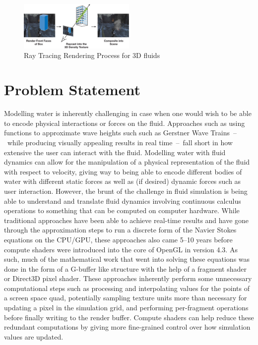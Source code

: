 \documentclass[conference]{IEEEtran}
\begin{document}
\begin{figure}[htbp]
\centerline{\includegraphics[width=0.5\textwidth]{volumerender.jpg}}
\caption{Ray Tracing Rendering Process for 3D fluids \cite{fluidrender}}
\label{volumerender}
\end{figure}

\section{Problem Statement}
Modelling water is inherently challenging in case when one would wish to be able to encode physical interactions or forces on the fluid. Approaches such as using functions to approximate wave heights such such as Gerstner Wave \mbox{Trains -- while} producing visually appealing results in real \mbox{time -- fall} short in how extensive the user can interact with the fluid. Modelling water with fluid dynamics can allow for the manipulation of a physical representation of the fluid with respect to velocity, giving way to being able to encode different bodies of water with different static forces as well as (if desired) dynamic forces such as user interaction. However, the brunt of the challenge in fluid simulation is being able to understand and translate fluid dynamics involving continuous calculus operations to something that can be computed on computer hardware.
While traditional approaches have been able to achieve real-time results and have gone through the approximation steps to run a discrete form of the Navier Stokes equations on the CPU/GPU, these approaches also came 5--10 years before compute shaders were introduced into the core of OpenGL in version 4.3. As such, much of the mathematical work that went into solving these equations was done in the form of a G-buffer like structure with the help of a fragment shader or Direct3D pixel shader. These approaches inherently perform some unnecessary computational steps such as processing and interpolating values for the points of a screen space quad, potentially sampling texture units more than necessary for updating a pixel in the simulation grid, and performing per-fragment operations before finally writing to the render buffer. Compute shaders can help reduce these redundant computations by giving more fine-grained control over how simulation values are updated.
\end{document}
